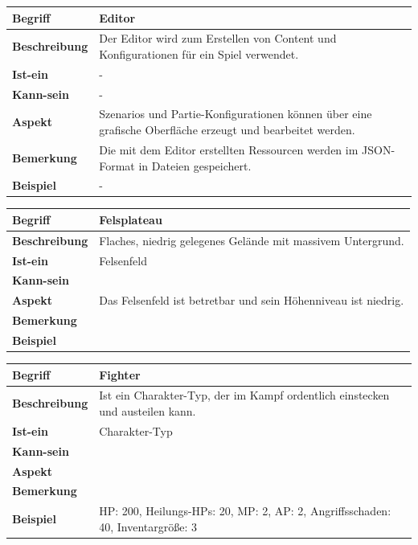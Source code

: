 \documentclass[12pt]{article}
\begin{document}
\begin{tabularx}{16cm}{|l|X|}
\hline
\textbf{Begriff} & \textbf{Editor} \\
\hline
\textbf{Beschreibung} & Der Editor wird zum Erstellen von Content und Konfigurationen für ein Spiel verwendet. \\
\hline
\textbf{Ist-ein} & - \\
\hline
\textbf{Kann-sein} & - \\
\hline
\textbf{Aspekt} & Szenarios und Partie-Konfigurationen können über eine grafische Oberfläche erzeugt und bearbeitet werden. \\
\hline
\textbf{Bemerkung} & Die mit dem Editor erstellten Ressourcen werden im JSON-Format in Dateien gespeichert. \\
\hline
\textbf{Beispiel} & - \\
\hline
\end{tabularx}

\begin{tabularx}{16cm}{|l|X|}
\hline
\textbf{Begriff} & \textbf{Felsplateau} \\
\hline
\textbf{Beschreibung} & Flaches, niedrig gelegenes Gelände mit massivem Untergrund. \\
\hline
\textbf{Ist-ein} & Felsenfeld\\
\hline
\textbf{Kann-sein} & \\
\hline
\textbf{Aspekt} & Das Felsenfeld ist betretbar und sein Höhenniveau ist niedrig.\\
\hline
\textbf{Bemerkung} &  \\
\hline
\textbf{Beispiel} &  \\
\hline
\end{tabularx}

\begin{tabularx}{16cm}{|l|X|}
\hline
\textbf{Begriff} & \textbf{Fighter} \\
\hline
\textbf{Beschreibung} & Ist ein Charakter-Typ, der im Kampf ordentlich einstecken und austeilen kann. \\
\hline
\textbf{Ist-ein} & Charakter-Typ\\
\hline
\textbf{Kann-sein} & \\
\hline
\textbf{Aspekt} & \\
\hline
\textbf{Bemerkung} &  \\
\hline
\textbf{Beispiel} & HP: 200, Heilungs-HPs: 20, MP: 2, AP: 2, Angriffsschaden: 40, Inventargröße: 3 \\
\hline
\end{tabularx}
\end{document}
